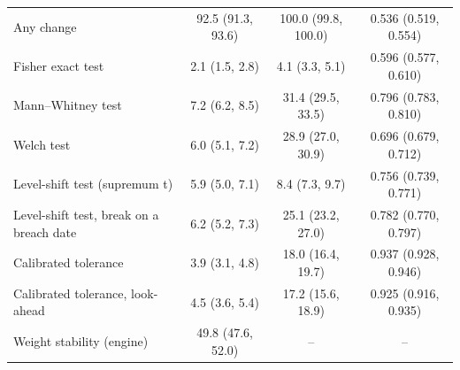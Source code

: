 \begin{table}[htbp]
\begin{tabular}{p{5.2cm}ccc}
Any change & 92.5 (91.3, 93.6) & 100.0 (99.8, 100.0) & 0.536 (0.519, 0.554) \\
Fisher exact test & 2.1 (1.5, 2.8) & 4.1 (3.3, 5.1) & 0.596 (0.577, 0.610) \\
Mann--Whitney test & 7.2 (6.2, 8.5) & 31.4 (29.5, 33.5) & 0.796 (0.783, 0.810) \\
Welch test & 6.0 (5.1, 7.2) & 28.9 (27.0, 30.9) & 0.696 (0.679, 0.712) \\
Level-shift test (supremum t) & 5.9 (5.0, 7.1) & 8.4 (7.3, 9.7) & 0.756 (0.739, 0.771) \\
Level-shift test, break on a breach date & 6.2 (5.2, 7.3) & 25.1 (23.2, 27.0) & 0.782 (0.770, 0.797) \\
Calibrated tolerance & 3.9 (3.1, 4.8) & 18.0 (16.4, 19.7) & 0.937 (0.928, 0.946) \\
Calibrated tolerance, look-ahead & 4.5 (3.6, 5.4) & 17.2 (15.6, 18.9) & 0.925 (0.916, 0.935) \\
Weight stability (engine) & 49.8 (47.6, 52.0) & -- & -- \\
\bottomrule
\end{tabular}
\end{table}
